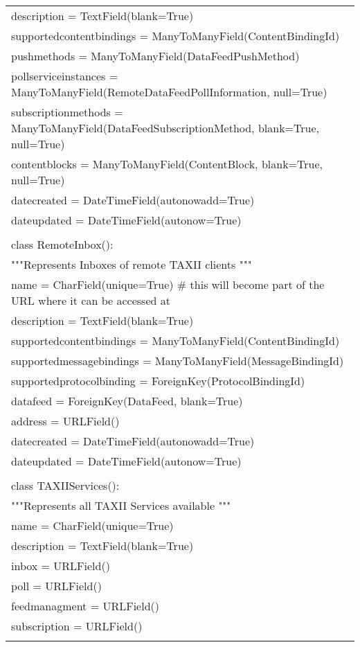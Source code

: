 \begin{center}
\begin{longtable}{|l|}
	    description = TextField(blank=True)\\
	    supportedcontentbindings = ManyToManyField(ContentBindingId)\\
	    pushmethods = ManyToManyField(DataFeedPushMethod)\\
	    pollserviceinstances = ManyToManyField(RemoteDataFeedPollInformation, null=True)\\
	    subscriptionmethods = ManyToManyField(DataFeedSubscriptionMethod, blank=True, null=True)\\
	    contentblocks = ManyToManyField(ContentBlock, blank=True, null=True)\\
	    datecreated = DateTimeField(autonowadd=True)\\
	    dateupdated = DateTimeField(autonow=True)\\
	\\
	class RemoteInbox():\\
	    """Represents Inboxes of remote TAXII clients """\\
	    name = CharField(unique=True) # this will become part of the URL where it can be accessed at\\
	    description = TextField(blank=True)\\
	    supportedcontentbindings = ManyToManyField(ContentBindingId)\\
	    supportedmessagebindings = ManyToManyField(MessageBindingId)\\
	    supportedprotocolbinding = ForeignKey(ProtocolBindingId)\\
	    datafeed = ForeignKey(DataFeed, blank=True)\\
	    address = URLField()\\
	    datecreated = DateTimeField(autonowadd=True)\\
	    dateupdated = DateTimeField(autonow=True)\\
	\\
	class TAXIIServices():\\
	    """Represents all TAXII Services available """\\
	    name = CharField(unique=True)\\
	    description = TextField(blank=True)\\
	    inbox = URLField()\\
	    poll = URLField()\\
	    feedmanagment = URLField()\\
	    subscription = URLField()\\
\\

			
			\hline
		\end{longtable}
	\end{center}
	
